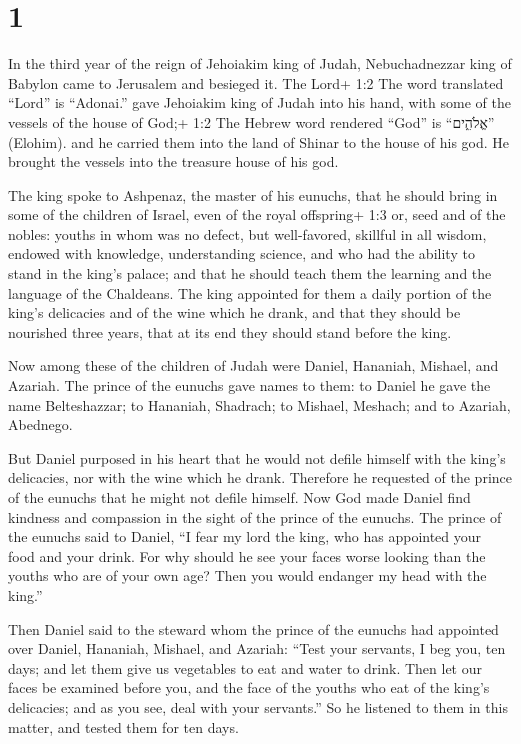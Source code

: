 \hypertarget{section}{%
\section{1}\label{section}}

 In the third year of the reign of Jehoiakim king of Judah,
Nebuchadnezzar king of Babylon came to Jerusalem and besieged it.
 The Lord+ 1:2 The word translated ``Lord'' is ``Adonai.''
gave Jehoiakim king of Judah into his hand, with some of the vessels of
the house of God;+ 1:2 The Hebrew word rendered ``God'' is ``אֱלֹהִ֑ים''
(Elohim). and he carried them into the land of Shinar to the house of
his god. He brought the vessels into the treasure house of his god.

 The king spoke to Ashpenaz, the master of his eunuchs, that
he should bring in some of the children of Israel, even of the royal
offspring+ 1:3 or, seed and of the nobles:  youths in whom
was no defect, but well-favored, skillful in all wisdom, endowed with
knowledge, understanding science, and who had the ability to stand in
the king's palace; and that he should teach them the learning and the
language of the Chaldeans.  The king appointed for them a
daily portion of the king's delicacies and of the wine which he drank,
and that they should be nourished three years, that at its end they
should stand before the king.

 Now among these of the children of Judah were Daniel,
Hananiah, Mishael, and Azariah.  The prince of the eunuchs
gave names to them: to Daniel he gave the name Belteshazzar; to
Hananiah, Shadrach; to Mishael, Meshach; and to Azariah, Abednego.

 But Daniel purposed in his heart that he would not defile
himself with the king's delicacies, nor with the wine which he drank.
Therefore he requested of the prince of the eunuchs that he might not
defile himself.  Now God made Daniel find kindness and
compassion in the sight of the prince of the eunuchs.  The
prince of the eunuchs said to Daniel, ``I fear my lord the king, who has
appointed your food and your drink. For why should he see your faces
worse looking than the youths who are of your own age? Then you would
endanger my head with the king.''

 Then Daniel said to the steward whom the prince of the
eunuchs had appointed over Daniel, Hananiah, Mishael, and Azariah:
 ``Test your servants, I beg you, ten days; and let them
give us vegetables to eat and water to drink.  Then let our
faces be examined before you, and the face of the youths who eat of the
king's delicacies; and as you see, deal with your servants.''
 So he listened to them in this matter, and tested them for
ten days.

